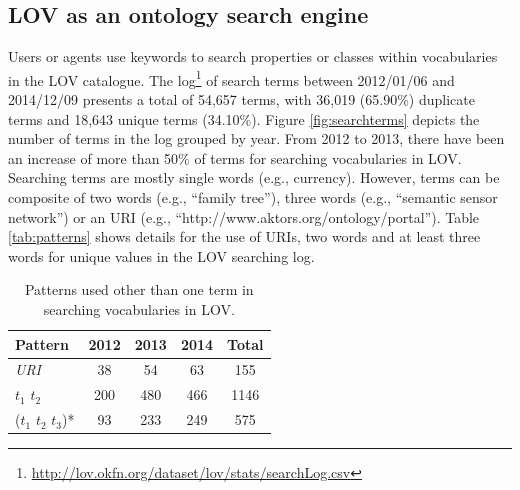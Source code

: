 \documentclass{iosart2c}
\begin{document}
\subsection{LOV as an ontology search engine}
\label{sec:ontoSearch}
Users or agents use keywords to search properties or classes within vocabularies in the LOV catalogue. The log\footnote{\url{http://lov.okfn.org/dataset/lov/stats/searchLog.csv}} of search terms between 2012/01/06 and 2014/12/09 presents a total of 54,657 terms, with 36,019 (65.90\%) duplicate terms and 18,643 unique terms (34.10\%). Figure \ref{fig:searchterms} depicts the number of terms in the log grouped by year. From 2012 to 2013, there have been an increase of more than 50\% of terms for searching vocabularies in LOV. Searching terms are mostly single words (e.g., currency). However, terms can be composite of two words (e.g., ``family tree''), three words (e.g., ``semantic sensor network'') or an URI (e.g., ``http://www.aktors.org/ontology/portal''). Table \ref{tab:patterns} shows details for the use of URIs, two words and at least three words for unique values in the LOV searching log.


\begin{table}[h!tb]
\caption{Patterns used other than one term in searching vocabularies in LOV.}
\begin{tabular}{lcccc}
\hline
\textbf{Pattern} & \textbf{2012} & \textbf{2013} & \textbf{2014} & \textbf{Total} \\ \hline
\textit{URI}  & 38   &  54  & 63  &  155      \\
$t_{1}$ $t_{2}$ & 200 & 480 & 466 & 1146 \\
($t_{1}$ $t_{2}$ $t_{3}$)* & 93 & 233 & 249 & 575\\
\hline  

\end{tabular}
\label{tab:patterns }
\end{table}

\begin{figure}[!htbp]
\end{figure}
\end{document}
